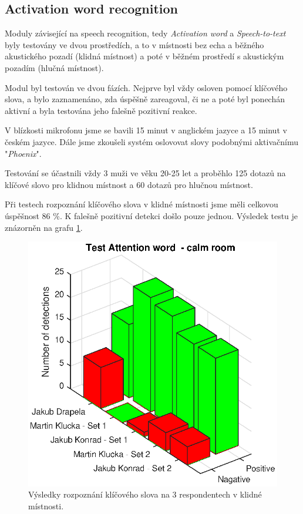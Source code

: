 \documentclass[12pt,a4paper]{article}
\begin{document}
\subsection{Activation word recognition}
Moduly závisející na speech recognition, tedy \textit{Activation word} a \textit{Speech-to-text} byly testovány ve dvou prostředích, a to v místnosti bez echa a běžného akustického pozadí (klidná místnost) a poté v běžném prostředí s  akustickým pozadím (hlučná místnost). 

Modul byl testován ve dvou fázích. Nejprve byl vždy osloven pomocí klíčového slova, a bylo zaznamenáno, zda úspěšně zareagoval, či ne a poté byl ponechán aktivní a byla testována jeho falešně pozitivní reakce. 

V blízkosti mikrofonu jsme se bavili 15 minut v anglickém jazyce a 15 minut v českém jazyce. Dále jsme zkoušeli systém oslovovat slovy podobnými aktivačnímu "\textit{Phoenix}".

 Testování se účastnili vždy 3 muži ve věku 20-25 let a proběhlo 125 dotazů na klíčové slovo pro klidnou místnost a 60 dotazů pro hlučnou místnost.
 
Při testech rozpoznání klíčového slova v klidné místnosti jsme měli celkovou úspěšnost 86 \%. K falešně pozitivní detekci došlo pouze jednou.  Výsledek testu je znázorněn na grafu \ref{fig:AttentionWord}.

	\begin{figure}[ht]
		
		\centering
		\includegraphics[width = 12cm]{AtWr_test.eps}
		\caption{Výsledky rozpoznání klíčového slova na 3 respondentech v klidné místnosti.}
		\label{fig:AttentionWord}
	\end{figure}
	
\end{document}
